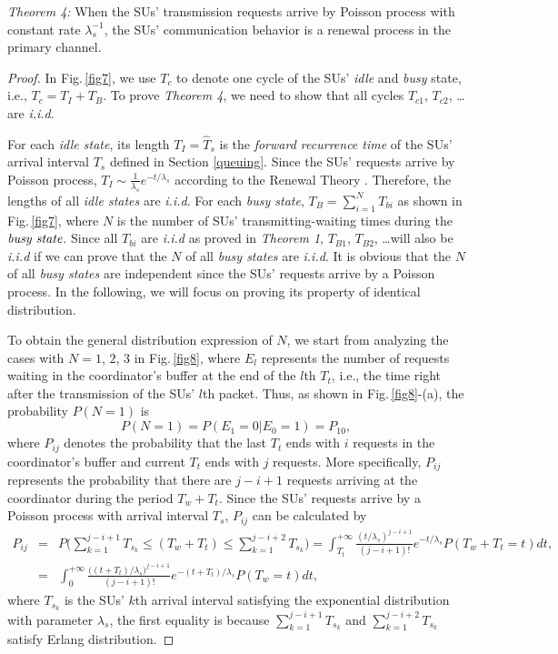 \documentclass[11pt,draftcls]{IEEEtran}{\onecolumn}
\begin{document}
\emph{Theorem 4:} When the SUs' transmission requests arrive by
Poisson process with constant rate $\lambda_s^{-1}$, the SUs'
communication behavior is a renewal process in the primary channel.

\begin{proof}
In Fig.\,\ref{fig7}, we use $T_c$ to denote one cycle of the SUs'
\emph{idle} and \emph{busy} state, i.e., $T_c=T_I+T_B$. To prove
\emph{Theorem 4}, we need to show that all cycles $T_{c1}$,
$T_{c2}$, \dots are \emph{i.i.d}.

For each \emph{idle state}, its length $T_I=\widehat{T}_s$ is the
\emph{forward recurrence time} of the SUs' arrival interval $T_s$
defined in Section \ref{queuing}. Since the SUs' requests arrive by
Poisson process, $T_I \sim \frac{1}{\lambda_s}e^{-t/\lambda_s}$
according to the Renewal Theory \cite{renew}. Therefore, the lengths
of all \emph{idle states} are \emph{i.i.d}. For each \emph{busy
state}, $T_B=\sum\limits_{i=1}^NT_{bi}$ as shown in
Fig.\,\ref{fig7}, where $N$ is the number of SUs'
transmitting-waiting times during the $\emph{busy state}$. Since all
$T_{bi}$ are \emph{i.i.d} as proved in \emph{Theorem 1}, $T_{B1}$,
$T_{B2}$, \dots will also be \emph{i.i.d} if we can prove that the
$N$ of all \emph{busy states} are \emph{i.i.d}. It is obvious that
the $N$ of all \emph{busy states} are independent since the SUs'
requests arrive by a Poisson process. In the following, we will
focus on proving its property of identical distribution.

To obtain the general distribution expression of $N$, we start from
analyzing the cases with $N=1$, $2$, $3$ in
Fig.\,\ref{fig8}, where $E_l$ represents the number of requests
waiting in the coordinator's buffer at the end of the $l$th $T_t$,
i.e., the time right after the transmission of the SUs' $l$th
packet. Thus, as shown in Fig.\,\ref{fig8}-(a), the probability
$P(N=1)$ is
\begin{equation}
P(N=1)=P(E_1=0|E_0=1)=P_{10},
\end{equation}
where $P_{ij}$ denotes the probability that the last $T_t$ ends with
$i$ requests in the coordinator's buffer and current $T_t$ ends with
$j$ requests. More specifically, $P_{ij}$ represents the probability
that there are $j-i+1$ requests arriving at the coordinator during
the period $T_w+T_t$. Since the SUs' requests arrive by a Poisson
process with arrival interval $T_s$, $P_{ij}$ can be calculated by
\begin{eqnarray}\label{pij0}
P_{ij}&=&P\Bigg(\sum\limits_{k=1}^{j-i+1}T_{s_k}\le(T_w+T_t)\le\sum\limits_{k=1}^{j-i+2}T_{s_k}\Bigg)
=\int_{T_t}^{+\infty}\frac{(t/\lambda_s)^{j-i+1}}{(j-i+1)!}e^{-t/\lambda_s}P(T_w+T_t=t)dt,\nonumber\\
&=&\int_{0}^{+\infty}\frac{\Big((t+T_t)/\lambda_s\Big)^{j-i+1}}{(j-i+1)!}e^{-(t+T_t)/\lambda_s}P(T_w=t)dt,
\end{eqnarray}
where $T_{s_k}$ is the SUs' $k$th arrival interval satisfying the
exponential distribution with parameter $\lambda_s$, the first
equality is because $\sum\limits_{k=1}^{j-i+1}T_{s_k}$ and
$\sum\limits_{k=1}^{j-i+2}T_{s_k}$ satisfy Erlang distribution.


\end{proof}
\end{document}
